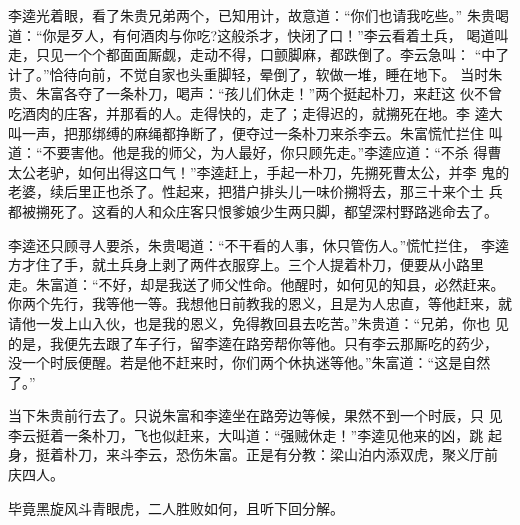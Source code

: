 李逵光着眼，看了朱贵兄弟两个，已知用计，故意道：“你们也请我吃些。”
朱贵喝道：“你是歹人，有何酒肉与你吃?这般杀才，快闭了口！”李云看着土兵，
喝道叫走，只见一个个都面面厮觑，走动不得，口颤脚麻，都跌倒了。李云急叫：
“中了计了。”恰待向前，不觉自家也头重脚轻，晕倒了，软做一堆，睡在地下。
当时朱贵、朱富各夺了一条朴刀，喝声：“孩儿们休走！”两个挺起朴刀，来赶这
伙不曾吃酒肉的庄客，并那看的人。走得快的，走了；走得迟的，就搠死在地。李
逵大叫一声，把那绑缚的麻绳都挣断了，便夺过一条朴刀来杀李云。朱富慌忙拦住
叫道：“不要害他。他是我的师父，为人最好，你只顾先走。”李逵应道：“不杀
得曹太公老驴，如何出得这口气！”李逵赶上，手起一朴刀，先搠死曹太公，并李
鬼的老婆，续后里正也杀了。性起来，把猎户排头儿一味价搠将去，那三十来个土
兵都被搠死了。这看的人和众庄客只恨爹娘少生两只脚，都望深村野路逃命去了。

李逵还只顾寻人要杀，朱贵喝道：“不干看的人事，休只管伤人。”慌忙拦住，
李逵方才住了手，就土兵身上剥了两件衣服穿上。三个人提着朴刀，便要从小路里
走。朱富道：“不好，却是我送了师父性命。他醒时，如何见的知县，必然赶来。
你两个先行，我等他一等。我想他日前教我的恩义，且是为人忠直，等他赶来，就
请他一发上山入伙，也是我的恩义，免得教回县去吃苦。”朱贵道：“兄弟，你也
见的是，我便先去跟了车子行，留李逵在路旁帮你等他。只有李云那厮吃的药少，
没一个时辰便醒。若是他不赶来时，你们两个休执迷等他。”朱富道：“这是自然
了。”

当下朱贵前行去了。只说朱富和李逵坐在路旁边等候，果然不到一个时辰，只
见李云挺着一条朴刀，飞也似赶来，大叫道：“强贼休走！”李逵见他来的凶，跳
起身，挺着朴刀，来斗李云，恐伤朱富。正是有分教：梁山泊内添双虎，聚义厅前
庆四人。

毕竟黑旋风斗青眼虎，二人胜败如何，且听下回分解。